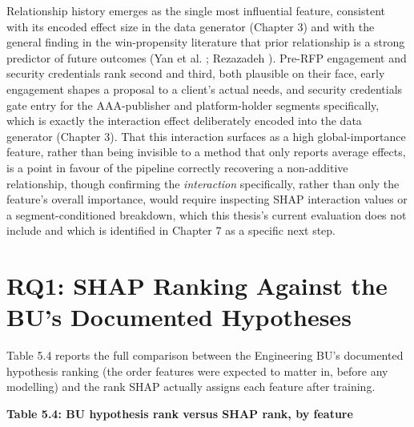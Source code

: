 \documentclass[12pt,oneside]{report}
\begin{document}
Relationship history emerges as the single most influential feature,
consistent with its encoded effect size in the data generator (Chapter
3) and with the general finding in the win-propensity literature that
prior relationship is a strong predictor of future outcomes (Yan et al.
\citeyearpar{yan2015sales}; Rezazadeh
\citeyearpar{rezazadeh2020generalized}). Pre-RFP engagement and security
credentials rank second and third, both plausible on their face, early
engagement shapes a proposal to a client's actual needs, and security
credentials gate entry for the AAA-publisher and platform-holder
segments specifically, which is exactly the interaction effect
deliberately encoded into the data generator (Chapter 3). That this
interaction surfaces as a high global-importance feature, rather than
being invisible to a method that only reports average effects, is a
point in favour of the pipeline correctly recovering a non-additive
relationship, though confirming the \emph{interaction} specifically,
rather than only the feature's overall importance, would require
inspecting SHAP interaction values or a segment-conditioned breakdown,
which this thesis's current evaluation does not include and which is
identified in Chapter 7 as a specific next step.

\hypertarget{rq1-shap-ranking-against-the-bus-documented-hypotheses}{%
\section{RQ1: SHAP Ranking Against the BU's Documented
Hypotheses}\label{rq1-shap-ranking-against-the-bus-documented-hypotheses}}

Table 5.4 reports the full comparison between the Engineering BU's
documented hypothesis ranking (the order features were expected to
matter in, before any modelling) and the rank SHAP actually assigns each
feature after training.

\textbf{Table 5.4: BU hypothesis rank versus SHAP rank, by feature}
\end{document}
